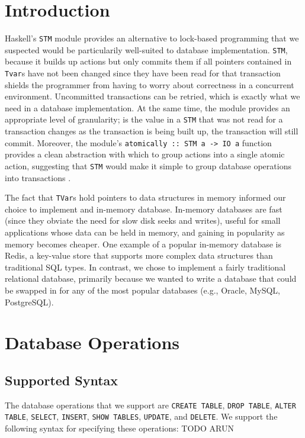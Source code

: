 \documentclass[10pt]{article}
\begin{document}
\vspace{5mm}
\begin{multicols}{2}

\section{Introduction} 
Haskell's \texttt{STM} module provides an alternative to lock-based programming that we suspected would be particularily well-suited to database implementation. \texttt{STM}, because it builds up actions but only commits them if all pointers contained in \texttt{Tvar}s have not been changed since they have been read for that transaction shields the programmer from having to worry about correctness in a concurrent environment. Uncommitted transactions can be retried, which is exactly what we need in a database implementation. At the same time, the module provides an appropriate level of granularity; is the value in a \texttt{STM} that was not read for a transaction changes as the transaction is being built up, the transaction will still commit. Moreover, the module's \texttt{atomically :: STM a -> IO a} function provides a clean abstraction with which to group actions into a single atomic action, suggesting that \texttt{STM} would make it simple to group database operations into transactions \cite{harris}. 

The fact that \texttt{TVar}s hold pointers to data structures in memory informed our choice to implement and in-memory database. In-memory databases are fast (since they obviate the need for slow disk seeks and writes), useful for small applications whose data can be held in memory, and gaining in popularity as memory becomes cheaper. One example of a popular in-memory database is Redis, a key-value store that supports more complex data structures than traditional SQL types. In contrast, we chose to implement a fairly traditional relational database, primarily because we wanted to write a database that could be swapped in for any of the most popular databases (e.g., Oracle, MySQL, PostgreSQL). 

\section{Database Operations}
\subsection{Supported Syntax}
\label{simplifying_parsing_assumptions}
The database operations that we support are \texttt{CREATE TABLE}, \texttt{DROP TABLE}, \texttt{ALTER TABLE}, \texttt{SELECT}, \texttt{INSERT}, \texttt{SHOW TABLES}, \texttt{UPDATE}, and \texttt{DELETE}.  We support the following syntax for specifying these operations:
TODO ARUN \\\\

\end{multicols}
\end{document}

